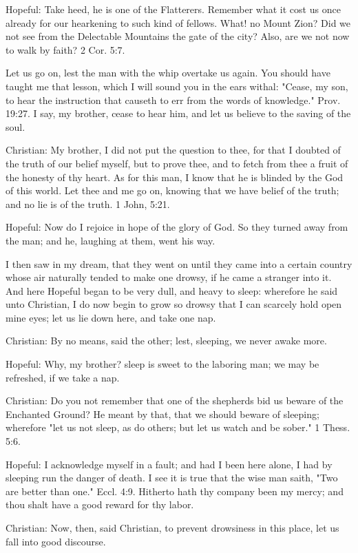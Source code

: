 Hopeful: Take heed, he is one of the Flatterers. Remember what it cost
us once already for our hearkening to such kind of fellows. What! no
Mount Zion? Did we not see from the Delectable Mountains the gate of
the city? Also, are we not now to walk by faith? 2 Cor. 5:7.

Let us go on, lest the man with the whip overtake us again. You should
have taught me that lesson, which I will sound you in the ears withal:
"Cease, my son, to hear the instruction that causeth to err from the
words of knowledge." Prov. 19:27. I say, my brother, cease to hear him,
and let us believe to the saving of the soul.

Christian: My brother, I did not put the question to thee, for that I
doubted of the truth of our belief myself, but to prove thee, and to
fetch from thee a fruit of the honesty of thy heart. As for this man, I
know that he is blinded by the God of this world. Let thee and me go
on, knowing that we have belief of the truth; and no lie is of the
truth. 1 John, 5:21.

Hopeful: Now do I rejoice in hope of the glory of God. So they turned
away from the man; and he, laughing at them, went his way.

I then saw in my dream, that they went on until they came into a
certain country whose air naturally tended to make one drowsy, if he
came a stranger into it. And here Hopeful began to be very dull, and
heavy to sleep: wherefore he said unto Christian, I do now begin to
grow so drowsy that I can scarcely hold open mine eyes; let us lie down
here, and take one nap.

Christian: By no means, said the other; lest, sleeping, we never awake
more.

Hopeful: Why, my brother? sleep is sweet to the laboring man; we may be
refreshed, if we take a nap.

Christian: Do you not remember that one of the shepherds bid us beware
of the Enchanted Ground? He meant by that, that we should beware of
sleeping; wherefore "let us not sleep, as do others; but let us watch
and be sober." 1 Thess. 5:6.

Hopeful: I acknowledge myself in a fault; and had I been here alone, I
had by sleeping run the danger of death. I see it is true that the wise
man saith, "Two are better than one." Eccl. 4:9. Hitherto hath thy
company been my mercy; and thou shalt have a good reward for thy labor.

Christian: Now, then, said Christian, to prevent drowsiness in this
place, let us fall into good discourse.

